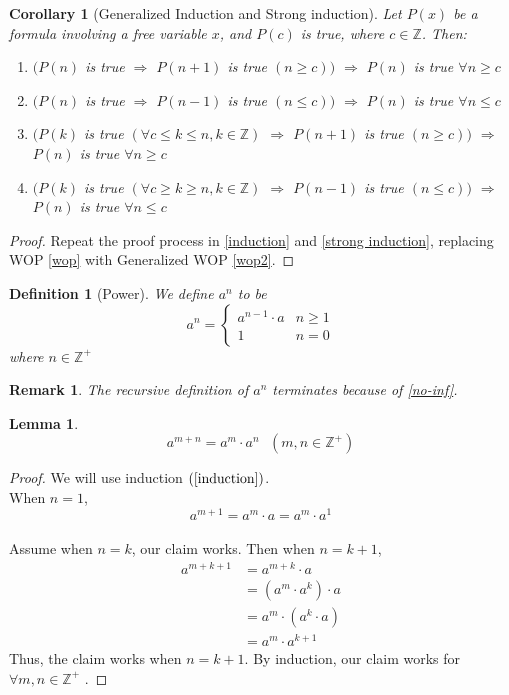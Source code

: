 \documentclass{article}
\newcommand{\Z}{\mathbb{Z}}
\newtheorem{defn}[thm]{Definition}
\newtheorem{cor}[thm]{Corollary}
\newtheorem{lem}[thm]{Lemma}
\newtheorem{rmk}[thm]{Remark}
\begin{document}
\begin{cor}[Generalized Induction and Strong induction]
\label{induction2}
Let $P(x)$ be a formula involving a free variable $x$, and $P(c)$ is true, where $c\in \Z$. Then:
\begin{enumerate}
    \item $(P(n)$ is true $\Rightarrow$ $P(n+1)$ is true $(n\geq c))$ $\Rightarrow$ $P(n)$ is true $\forall n\geq c$
    \item $(P(n)$ is true $\Rightarrow$ $P(n-1)$ is true $(n\leq c))$ $\Rightarrow$ $P(n)$ is true $\forall n\leq c$
    \item $(P(k)$ is true $(\forall c\leq k \leq n, k\in \Z )$ $\Rightarrow$ $P(n+1)$ is true $(n\geq c))$ $\Rightarrow$ $P(n)$ is true $\forall n\geq c$
    \item $(P(k)$ is true $(\forall c\geq k \geq n, k\in \Z )$ $\Rightarrow$ $P(n-1)$ is true $(n\leq c))$ $\Rightarrow$ $P(n)$ is true $\forall n\leq c$
\end{enumerate}
\end{cor}
\begin{proof}
Repeat the proof process in \ref{induction} and \ref{strong induction}, replacing WOP \ref{wop} with Generalized WOP \ref{wop2}. 
\end{proof}

\begin{defn}[Power]
\label{exp}We define $a^{n}$ to be
\begin{equation}
    a^{n}=
    \begin{cases}
    a^{n-1}\cdot a    &  n\geq 1\\
    1                 & n=0
    \end{cases}
\end{equation}
 where $n\in \Z^{+}$
\end{defn}
\begin{rmk}
The recursive definition of $a^{n}$ terminates because of \ref{no-inf}.
\end{rmk}

\begin{lem}
\label{pow1}
$$a^{m+n}=a^{m}\cdot a^{n} \text{   } (m,n\in \Z^{+})$$
\end{lem}
\begin{proof}
We will use induction $(\ref{induction})$. \\
When $n=1$, $$a^{m+1}=a^{m}\cdot a=a^{m}\cdot a^{1}$$\\
Assume when $n=k$, our claim works. Then when $n=k+1$, 
\begin{equation}
\begin{split}
    a^{m+k+1}&=a^{m+k}\cdot a\\
    &=( a^{m}\cdot a^{k})\cdot a\\
    &=a^{m}\cdot (a^{k}\cdot a)\\
    &= a^{m} \cdot a^{k+1}
\end{split}
\end{equation}
Thus, the claim works when $n=k+1$. By induction, our claim works for $\forall m,n \in \Z^{+}$ .
\end{proof}
\end{document}
